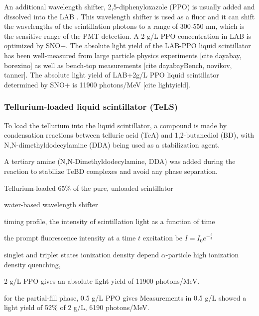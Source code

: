 An additional wavelength shifter, 2,5-diphenyloxazole (PPO) is usually added and dissolved into the LAB \cite{wunderly1990new}. This wavelength shifter is used as a fluor and it can shift the wavelengths of the scintillation photons to a range of 300-550 nm, which is the sensitive range of the PMT detection.  A 2 g/L PPO concentration in LAB is optimized by SNO+\cite{whitepaper}. The absolute light yield of the LAB-PPO liquid scintillator has been well-measured from large particle physics experiments [cite dayabay, borexino] as well as bench-top measurements [cite dayabayBench, novikov, tanner]. The absolute light yield of LAB+2g/L PPO liquid scintillator determined by SNO+ is 11900 photons/MeV [cite lightyield].



\subsubsection{Tellurium-loaded liquid scintillator (TeLS)}

To load the tellurium into the liquid scintillator, a compound is made by 
condensation reactions between telluric acid (TeA) and 1,2-butanediol (BD), with N,N-dimethyldodecylamine (DDA) being used as a stabilization agent.

A tertiary amine (N,N-Dimethyldodecylamine, DDA) was added during the reaction to stabilize TeBD complexes and avoid any phase separation. 




Tellurium-loaded 65\% of the pure, unloaded scintillator



water-based wavelength shifter


timing profile, the intensity of scintillation light as a function of time

the prompt fluorescence intensity at a time $t$ excitation be $I=I_0e^{-\frac{t}{\tau}}$



singlet and triplet states 
ionization density 
depend
$\alpha$-particle
high ionization density 
quenching, 




2 g/L PPO gives an absolute light yield of 11900 photons/MeV.


for the partial-fill phase, 0.5 g/L PPO gives Measurements in 0.5 g/L showed a light yield of 52\% of 2 g/L,  
6190 photons/MeV\cite{tanner0p5,joshW1}.





